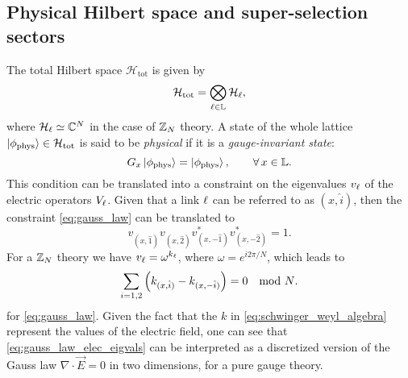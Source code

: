 %
%
\subsection{Physical Hilbert space and super-selection sectors}
\label{sub:physical_hilbert_space_and_super_selection_sectors}


The total Hilbert space $\mathcal{H}_{\text{tot}}$ is given by
\begin{equation}
    \mathcal{H}_{\text{tot}} = \bigotimes_{\ell \in \mathbb{L}} \mathcal{H}_{\ell},
\end{equation}
where $\mathcal{H}_\ell \simeq \mathbb{C}^N$ in the case of $\mathbb{Z}_N$ theory.
A state of the whole lattice $\ket{\phi_{\text{phys}}} \in \mathcal{H}_{\text{tot}}$ is said to be \emph{physical} if it is a \emph{gauge-invariant state}:
\begin{equation}
    G_x \ket{\phi_{\text{phys}}} = \ket{\phi_{\text{phys}}}, \qquad \forall \, x \in \mathbb{L}.
    \label{eq:gauss_law}
\end{equation}
This condition can be translated into a constraint on the eigenvalues $v_{\ell}$ of the electric operators $V_{\ell}$.
Given that a link $\ell$ can be referred to as $(x, \hat{i})$,  then the constraint \eqref{eq:gauss_law} can be translated to
\begin{equation}
    v_{(x, \hat{1})}^{\phantom{\ast}}
    v_{(x, \hat{2})}^{\phantom{\ast}}
    v_{(x, -\hat{1})}^\ast
    v_{(x, -\hat{2})}^\ast = 1.
\end{equation}
For a $\mathbb{Z}_N$ theory we have $v_\ell = \omega^{k_{\ell}}$, where $\omega = e^{i2 \pi / N}$, which leads to
\begin{equation}
    \sum_{i=1,2} \pqty{ k_{(x, \hat{i})} - k_{(x, -\hat{i})} } = 0 \quad \text{mod $N$}.
    \label{eq:gauss_law_elec_eigvals}
\end{equation}
for \eqref{eq:gauss_law}.
Given the fact that the $k$ in \eqref{eq:schwinger_weyl_algebra} represent the values of the electric field, one can see that \eqref{eq:gauss_law_elec_eigvals} can be interpreted as a discretized version of the Gauss law $\nabla \cdot \vec{E} = 0$ in two dimensions, for a pure gauge theory.

